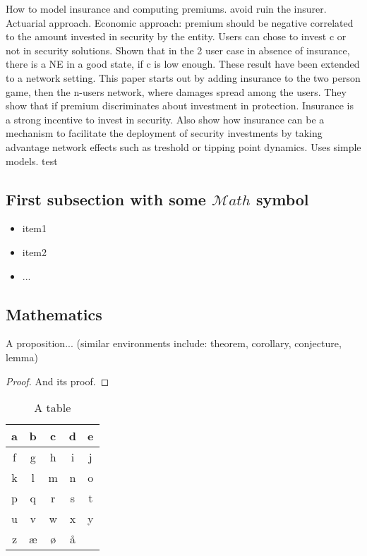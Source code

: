 How to model insurance and computing premiums. avoid ruin the insurer. Actuarial approach. Economic approach:  premium should be negative correlated to the amount
invested in security by the entity. Users can chose to invest c or not in security
solutions. Shown that in the 2 user case in absence of insurance, there is a NE
in a good state, if c is low enough. These result have been extended to a
network setting. This paper starts out by adding insurance to the two person game, then the n-users network, where damages spread among the users. They show that if premium discriminates about investment in protection. Insurance is a strong incentive to invest in security. Also show how insurance can be a mechanism to facilitate the deployment of security investments by taking advantage network effects such as treshold or tipping point dynamics. Uses simple models. 
test



\subsection{First subsection with some \texorpdfstring{$\mathcal{M}ath$}{Math} symbol}\label{sec:first_ssection}

\blindtext
\begin{itemize}[topsep=-1em,parsep=0em,itemsep=0em] %
 \item item1
 \item item2
 \item ...
\end{itemize}

\subsection{Mathematics}



\begin{proposition}\label{def:a_proposition}
A proposition... (similar environments include: theorem, corollary, conjecture, lemma)

\end{proposition}

\begin{proof}
\vspace*{-1em} %
And its proof.
\end{proof}

\begin{table}
\caption{\label{tab:example}A table}
\centering
\begin{tabular}[b]{| c | c | c | c | c |}
\hline
a & b & c & d & e \\ \hline
f & g & h & i & j \\ \hline
k & l & m & n & o \\ \hline
p & q & r & s & t \\ \hline
u & v & w & x & y \\ \hline
z & æ & ø & å &   \\ \hline
\end{tabular} 
\end{table}

